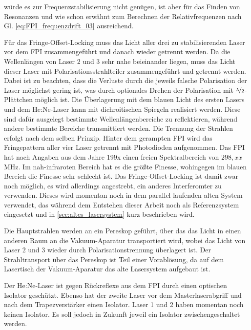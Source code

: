 würde es zur Frequenzstabilisierung nicht genügen, ist aber für das Finden von Resonanzen und wie schon erwähnt zum Berechnen der Relativfrequenzen nach Gl. \eqref{eq:FPI_frequenzdrift_03}
ausreichend.\par
Für das Fringe-Offset-Locking muss das Licht aller drei zu stabilisierenden
Laser vor dem FPI zusammengeführt und danach wieder getrennt werden. Da die
Wellenlängen von Laser 2 und 3 sehr nahe beieinander liegen, muss das Licht
dieser Laser mit Polarisationsstrahlteiler zusammengeführt und getrennt werden.
Dabei ist zu beachten, dass die Verluste durch die jeweils falsche Polarisation
der Laser möglichst gering ist, was durch optionales Drehen der
Polarisation mit $\nicefrac{\lambda}{2}$-Plättchen möglich ist. Die Überlagerung
mit dem blauen Licht des ersten Lasers und dem He:Ne-Laser kann mit
dichroitischen Spiegeln realisiert werden. Diese sind dafür ausgelegt bestimmte
Wellenlängenbereiche zu reflektieren, während andere bestimmte Bereiche
transmittiert werden. Die Trennung der Strahlen erfolgt nach dem selben
Prinzip. Hinter dem gerampten FPI wird das Fringepattern aller vier Laser
getrennt mit Photodioden aufgenommen. Das FPI hat nach Angaben aus dem Jahre 199x einen
freien Spektralbereich von $298,xx\,$MHz. Im nah-infraroten Bereich hat es die
größte Finesse, wohingegen im blauen Bereich die Finesse sehr schlecht ist.
Das Fringe-Offset-Locking ist damit zwar noch möglich, es wird allerdings
angestrebt, ein anderes Interferomter zu verwenden. Dieses wird momentan
noch in dem parallel laufenden alten System verwendet, das während dem
Entstehen dieser Arbeit noch als Referenzsystem eingesetzt und in
\ref{sec:altes_lasersystem} kurz beschrieben wird.\par
Die Hauptstrahlen werden an ein Pereskop geführt, über das das Licht in einen
anderen Raum an die Vakuum-Aparatur transportiert wird, wobei das Licht von
Laser 2 und 3 wieder durch Polarisationstrennung überlagert ist. Der
Strahltransport über das Pereskop ist Teil einer Vorablösung, da auf dem
Lasertisch der Vakuum-Aparatur das alte Lasersystem aufgebaut ist.\par
Der He:Ne-Laser ist gegen Rückreflexe aus dem FPI durch einen optischen Isolator
geschützt. Ebenso hat der zweite Laser vor dem Masterlaserabgriff und nach dem
Trapezverstärker einen Isolator. Laser 1 und 2 haben momentan noch keinen
Isolator. Es soll jedoch in Zukunft jeweil ein Isolator zwischengeschaltet
werden.

